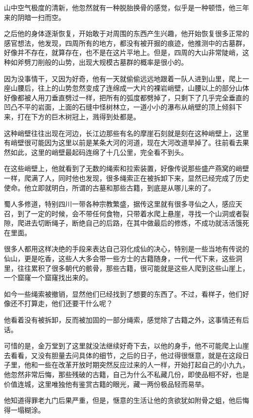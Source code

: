 山中空气极度的清新，他忽然就有一种脱胎换骨的感觉，似乎是一种顿悟，他三年来的阴暗一扫而空。

之后他的身体逐渐恢复，开始敢于对周围的东西产生兴趣，他开始恢复很多正常的感官想法，他发现，四周所有的地方，都没有被开掘的痕迹，他推测中的古墓群，好像并不存在，就算存在，也不是在这片平地上。但是，四周的大山非常陡峭，这种如斧劈刀削般的山势，出现大规模古墓群的概率是很小的。

因为没事情干，又因为好奇，他有一天就偷偷远远地跟着一队人进到山里，爬上一座山腰后，往上的山势忽然变成了连绵成一大片的裸岩峭壁，山腰以上的部分山体好像都被人用刀垂直劈过一样，把所有的弧度都劈掉了，只剩下了几乎完全垂直的凹凸不平的岩面，上面的石缝中怪树林立，一道小小的瀑布从峭壁的顶上倾斜下来，打在下方的巨木树冠上，溅得到处都是。

这种峭壁往往出现在河边，长江边那些有名的摩崖石刻就是刻在这种峭壁上，这里有峭壁很可能因为这里以前是某条大河的河道，现在大河改道旱掉了。往前看去果然如此，这里的峭壁最起码连绵了十几公里，完全看不到头。

在这些峭壁上，他就看到了无数的绳索和拉索装置，好像传说那些盛产燕窝的峭壁一样，爬满了人，同时他也发现，很多绳索正在被拆卸下来，显然已经完成了历史使命。他立即就明白，所谓的古墓和那些古籍，到底是从哪儿来的了。

蜀人多修道，特别四川一带各种宗教繁盛，据传这里就有很多寻仙之人，感应天召，到了一定的时候，会不带任何食物，只带着水爬上悬崖，寻找一个山洞或者裂隙，爬进去切断绳子，断绝自己的后路，在其中做最后的修炼，不成功就活活饿死在里面。

很多人都用这样决绝的手段来表达自己羽化成仙的决心，特别是一些当地有传说的仙山，更是吃香，这些人大多会带一些方士的古籍随身，一代一代下来，这些洞里，往往累积了很多朝代的骸骨，那些古籍，很可能就是这些人爬到这些山崖上，一个窟窿一个窟窿找出来的。

如今一些绳索被撤销，显然他们已经找到了想要的东西了。不过，看样子，他们好像还不打算走，他们还要干什么呢？

他看着没有被拆卸，反而被加固的一部分绳索，感觉除了古籍之外，这事情还有后话。

可惜的是，金万堂到了这里就没法继续好奇下去，以他的身手，他不可能爬上山崖去看看，又没有胆量去问具体的细节，之后的日子，他过得很惬意，就是在这段日子里，他和一些在改革开放时期突然反应过来的人一样，开始打起自己的小九九，他忽然非常后悔，那些残破的古籍，自己为什么不私藏几份，即使品相不好，也是价值连城，这里唯独他有鉴赏古籍的眼光，藏一两份极品轻而易举。

他知道得罪老九门后果严重，但是，惬意的生活让他的贪欲犹如附骨之蛆，他后悔得一塌糊涂。

